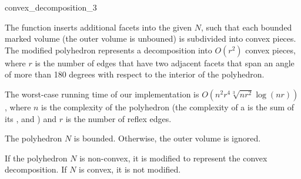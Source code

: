 
\ccHtmlNoClassLinks
\begin{ccRefFunction}{convex_decomposition_3}
\label{refconvex_decomposition_3}

\ccDefinition

The function  inserts additional facets
into the given  $N$, such that each bounded
marked volume (the outer volume is unbouned) is subdivided into convex
pieces. The modified polyhedron represents a decomposition into
$O(r^2)$ convex pieces, where $r$ is the number of edges that have two
adjacent facets that span an angle of more than 180 degrees with
respect to the interior of the polyhedron.

The worst-case running time of our implementation is
$O(n^2r^4\sqrt[3]{nr^2}\log{(nr)})$, where $n$ is the complexity of
the polyhedron (the complexity of a  is the sum
of its ,  and ) and $r$
is the number of reflex edges.


\ccPrecond

The polyhedron $N$ is bounded. Otherwise, the outer volume is ignored.

\ccPostcond

If the polyhedron $N$ is non-convex, it is modified to represent the
convex decomposition. If $N$ is convex, it is not modified.

\ccSeeAlso
{}\\ 

\end{ccRefFunction}
